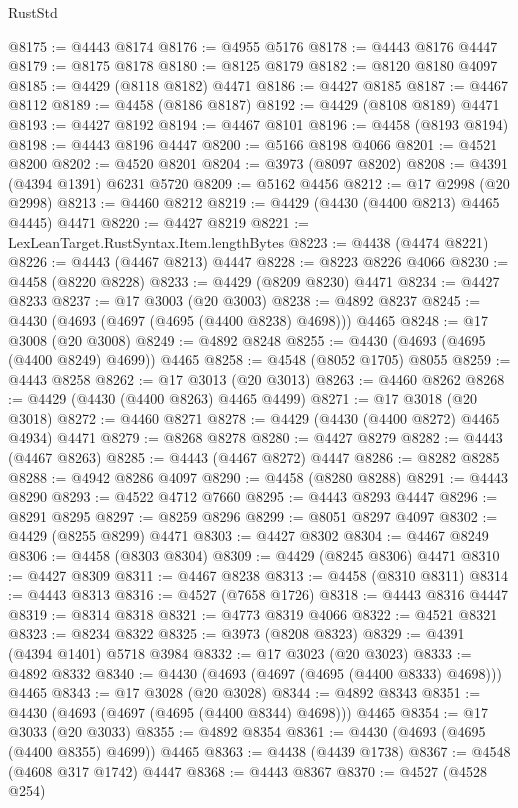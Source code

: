 \begin{lexlean}{RustStd}
\begin{coremodule}
{\begin{coremodule}
{{{{{{{{{{{{{{{{{{{{{{{{{{{{{{{{{{{{{{{{{{{{{{{{{{{{{{{{{{{{{{{{{{{{@8175 := @4443 @8174
@8176 := @4955 @5176
@8178 := @4443 @8176 @4447
@8179 := @8175 @8178
@8180 := @8125 @8179
@8182 := @8120 @8180 @4097
@8185 := @4429 (@8118 @8182) @4471
@8186 := @4427 @8185
@8187 := @4467 @8112
@8189 := @4458 (@8186 @8187)
@8192 := @4429 (@8108 @8189) @4471
@8193 := @4427 @8192
@8194 := @4467 @8101
@8196 := @4458 (@8193 @8194)
@8198 := @4443 @8196 @4447
@8200 := @5166 @8198 @4066
@8201 := @4521 @8200
@8202 := @4520 @8201
@8204 := @3973 (@8097 @8202)
@8208 := @4391 (@4394 @1391) @6231 @5720
@8209 := @5162 @4456
@8212 := @17 @2998 (@20 @2998)
@8213 := @4460 @8212
@8219 := @4429 (@4430 (@4400 @8213) @4465 @4445) @4471
@8220 := @4427 @8219
@8221 := LexLeanTarget.RustSyntax.Item.lengthBytes
@8223 := @4438 (@4474 @8221)
@8226 := @4443 (@4467 @8213) @4447
@8228 := @8223 @8226 @4066
@8230 := @4458 (@8220 @8228)
@8233 := @4429 (@8209 @8230) @4471
@8234 := @4427 @8233
@8237 := @17 @3003 (@20 @3003)
@8238 := @4892 @8237
@8245 := @4430 (@4693 (@4697 (@4695 (@4400 @8238) @4698))) @4465
@8248 := @17 @3008 (@20 @3008)
@8249 := @4892 @8248
@8255 := @4430 (@4693 (@4695 (@4400 @8249) @4699)) @4465
@8258 := @4548 (@8052 @1705) @8055
@8259 := @4443 @8258
@8262 := @17 @3013 (@20 @3013)
@8263 := @4460 @8262
@8268 := @4429 (@4430 (@4400 @8263) @4465 @4499)
@8271 := @17 @3018 (@20 @3018)
@8272 := @4460 @8271
@8278 := @4429 (@4430 (@4400 @8272) @4465 @4934) @4471
@8279 := @8268 @8278
@8280 := @4427 @8279
@8282 := @4443 (@4467 @8263)
@8285 := @4443 (@4467 @8272) @4447
@8286 := @8282 @8285
@8288 := @4942 @8286 @4097
@8290 := @4458 (@8280 @8288)
@8291 := @4443 @8290
@8293 := @4522 @4712 @7660
@8295 := @4443 @8293 @4447
@8296 := @8291 @8295
@8297 := @8259 @8296
@8299 := @8051 @8297 @4097
@8302 := @4429 (@8255 @8299) @4471
@8303 := @4427 @8302
@8304 := @4467 @8249
@8306 := @4458 (@8303 @8304)
@8309 := @4429 (@8245 @8306) @4471
@8310 := @4427 @8309
@8311 := @4467 @8238
@8313 := @4458 (@8310 @8311)
@8314 := @4443 @8313
@8316 := @4527 (@7658 @1726)
@8318 := @4443 @8316 @4447
@8319 := @8314 @8318
@8321 := @4773 @8319 @4066
@8322 := @4521 @8321
@8323 := @8234 @8322
@8325 := @3973 (@8208 @8323)
@8329 := @4391 (@4394 @1401) @5718 @3984
@8332 := @17 @3023 (@20 @3023)
@8333 := @4892 @8332
@8340 := @4430 (@4693 (@4697 (@4695 (@4400 @8333) @4698))) @4465
@8343 := @17 @3028 (@20 @3028)
@8344 := @4892 @8343
@8351 := @4430 (@4693 (@4697 (@4695 (@4400 @8344) @4698))) @4465
@8354 := @17 @3033 (@20 @3033)
@8355 := @4892 @8354
@8361 := @4430 (@4693 (@4695 (@4400 @8355) @4699)) @4465
@8363 := @4438 (@4439 @1738)
@8367 := @4548 (@4608 @317 @1742) @4447
@8368 := @4443 @8367
@8370 := @4527 (@4528 @254)
}}}}}}}}}}}}}}}}}}}}}}}}}}}}}}}}}}}}}}}}}}}}}}}}}}}}}}}}}}}}}}}}}}}}
\end{coremodule}}
\end{coremodule}
\end{lexlean}
